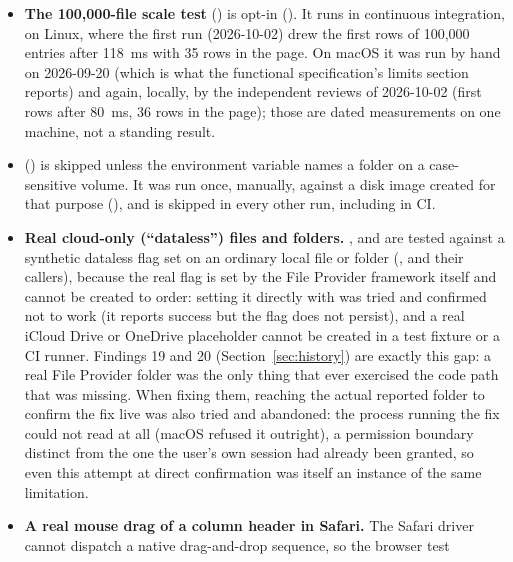 \begin{itemize}
  \item \textbf{The 100{,}000-file scale test} () is opt-in
        ().  It runs in continuous integration, on Linux, where the
        first run (2026-10-02) drew the first rows of 100{,}000 entries after 118~ms with
        35 rows in the page.  On macOS it was run by hand on 2026-09-20 (which is what the
        functional specification's limits section reports) and again, locally, by the
        independent reviews of 2026-10-02 (first rows after 80~ms, 36 rows in the page);
        those are dated measurements on one machine, not a standing result.
  \item \textbf{} () is
        skipped unless the environment variable 
        names a folder on a case-sensitive volume.  It was run once, manually, against a
        disk image created for that purpose (), and is skipped in every other run, including in CI.
  \item \textbf{Real cloud-only (``dataless'') files and folders.}  ,
         and  are tested against a synthetic dataless flag set on
        an ordinary local file or folder (, 
        and their callers), because the real flag is set by the File Provider framework
        itself and cannot be created to order: setting it directly with 
        was tried and confirmed not to work (it reports success but the flag does not
        persist), and a real iCloud Drive or OneDrive placeholder cannot be created in a
        test fixture or a CI runner.  Findings 19 and 20 (Section~\ref{sec:history}) are
        exactly this gap: a real File Provider folder was the only thing that ever
        exercised the code path that was missing.  When fixing them, reaching the actual
        reported folder to confirm the fix live was also tried and abandoned: the
        process running the fix could not read 
        at all (macOS refused it outright), a permission boundary distinct from the one
        the user's own session had already been granted, so even this attempt at direct
        confirmation was itself an instance of the same limitation.
  \item \textbf{A real mouse drag of a column header in Safari.}  The Safari driver
        cannot dispatch a native drag-and-drop sequence, so the browser test

\end{itemize}
